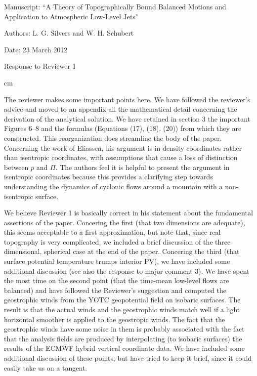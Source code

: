 \documentclass[11pt]{article}
\begin{document}
 

\noindent Manuscript: ``A Theory of Topographically Bound Balanced Motions and Application to Atmospheric Low-Level Jets"

\noindent Authors:  L. G. Silvers and W. H. Schubert 

\noindent Date:  23 March 2012

\bigskip
\centerline{Response to Reviewer 1}

 cm



\medskip
{}  The reviewer makes some important points here. We have followed the reviewer's 
advice and moved to an appendix all the mathematical detail concerning the derivation 
of the analytical solution. We have retained in section 3 the important Figures 6--8 and 
the formulas (Equations (17), (18), (20)) from which they are constructed. This reorganization 
does streamline the body of the paper. Concerning the work of Eliassen, his argument is in 
density coordinates rather than isentropic coordinates, with assumptions that cause a loss of 
distinction between $p$ and $\Pi$.  The authors feel it is helpful to present the argument 
in isentropic coordinates because this provides a clarifying step towards 
understanding the dynamics of cyclonic flows around a mountain with a non-isentropic surface.  
  
\medskip
{}  We believe Reviewer 1 is basically correct in his statement about the 
fundamental assertions of the paper. Concering the first (that two dimensions are adequate), 
this seems acceptable to a first approximation, but note that, since real topography is very 
complicated, we included a brief discussion of the three dimensional, spherical case at the 
end of the paper. Concering the third (that surface potential temperature trumps interior PV), 
we have included some additional discussion (see also the response to major comment 3).    
We have spent the most time on the second point (that the time-mean low-level flows are 
balanced) and have followed the Reviewer's suggestion and computed the geostrophic winds 
from the YOTC geopotential field on isobaric surfaces. The result is that the actual winds 
and the geostrophic winds match well if a light horizontal smoother is applied to the 
geostropic winds. The fact that the geostrophic winds have some noise in them is
probably associated with the fact that the analysis fields are produced by interpolating 
(to isobaric surfaces) the results of the ECMWF hybrid vertical coordinate data. 
We have included some additional discussion of these points, but have tried to keep 
it brief, since it could easily take us on a tangent. 
  
\end{document}
